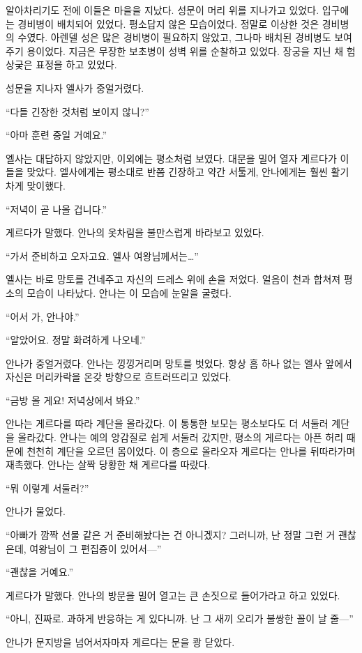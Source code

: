알아차리기도 전에 이들은 마을을 지났다. 성문이 머리 위를 지나가고 있었다. 입구에는 경비병이 배치되어 있었다. 평소답지 않은 모습이었다. 정말로 이상한 것은 경비병의 수였다. 아렌델 성은 많은 경비병이 필요하지 않았고, 그나마 배치된 경비병도 보여주기 용이었다. 지금은 무장한 보초병이 성벽 위를 순찰하고 있었다. 장궁을 지닌 채 험상궂은 표정을 하고 있었다.

성문을 지나자 엘사가 중얼거렸다.

``다들 긴장한 것처럼 보이지 않니?''

``아마 훈련 중일 거예요.''

엘사는 대답하지 않았지만, 이외에는 평소처럼 보였다. 대문을 밀어 열자 게르다가 이들을 맞았다. 엘사에게는 평소대로 반쯤 긴장하고 약간 서툴게, 안나에게는 훨씬 활기차게 맞이했다.

``저녁이 곧 나올 겁니다.''

게르다가 말했다. 안나의 옷차림을 불만스럽게 바라보고 있었다.

``가서 준비하고 오자고요. 엘사 여왕님께서는\ldots''

엘사는 바로 망토를 건네주고 자신의 드레스 위에 손을 저었다. 얼음이 천과 합쳐져 평소의 모습이 나타났다. 안나는 이 모습에 눈알을 굴렸다.

``어서 가, 안나야.''

``알았어요. 정말 화려하게 나오네.''

안나가 중얼거렸다. 안나는 낑낑거리며 망토를 벗었다. 항상 흠 하나 없는 엘사 앞에서 자신은 머리카락을 온갖 방향으로 흐트러뜨리고 있었다.

``금방 올 게요! 저녁상에서 봐요.''

안나는 게르다를 따라 계단을 올라갔다. 이 통통한 보모는 평소보다도 더 서둘러 계단을 올라갔다. 안나는 예의 앙감질로 쉽게 서둘러 갔지만, 평소의 게르다는 아픈 허리 때문에 천천히 계단을 오르던 몸이었다. 이 층으로 올라오자 게르다는 안나를 뒤따라가며 재촉했다. 안나는 살짝 당황한 채 게르다를 따랐다.

``뭐 이렇게 서둘러?''

안나가 물었다.

``아빠가 깜짝 선물 같은 거 준비해놨다는 건 아니겠지? 그러니까, 난 정말 그런 거 괜찮은데, 여왕님이 그 편집증이 있어서—''

``괜찮을 거예요.''

게르다가 말했다. 안나의 방문을 밀어 열고는 큰 손짓으로 들어가라고 하고 있었다.

``아니, 진짜로. 과하게 반응하는 게 있다니까. 난 그 새끼 오리가 불쌍한 꼴이 날 줄—''

안나가 문지방을 넘어서자마자 게르다는 문을 쾅 닫았다.


